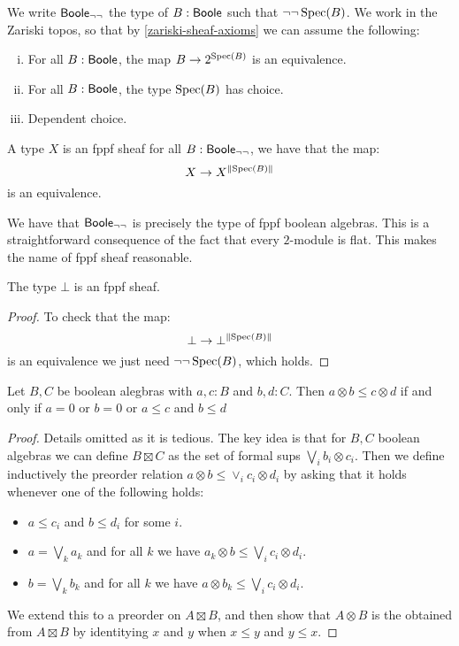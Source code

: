 We write $\mathsf{Boole}_{\neg\neg}$ the type of $B:\mathsf{Boole}$ such that $\neg\neg\operatorname{Spec}(B)$. We work in the Zariski topos, so that by \cref{zariski-sheaf-axioms} we can assume the following:

\begin{enumerate}[(i)]
\item For all $B:\mathsf{Boole}$, the map $B\to {2}^{\operatorname{Spec}(B)}$ is an equivalence.
\item For all $B:\mathsf{Boole}$, the type $\operatorname{Spec}(B)$ has choice.
\item Dependent choice.
\end{enumerate}

\begin{definition}
A type $X$ is an fppf sheaf for all $B:\mathsf{Boole}_{\neg\neg}$, we have that the map:
\[X\to X^{\lVert \operatorname{Spec}(B) \rVert}\]
is an equivalence.
\end{definition}

\begin{remark}
We have that $\mathsf{Boole}_{\neg\neg}$ is precisely the type of fppf boolean algebras. This is a straightforward consequence of the fact that every ${2}$-module is flat. This makes the name of fppf sheaf reasonable.
\end{remark}

\begin{lemma}\label{bot-sheaf}
The type $\bot$ is an fppf sheaf.
\end{lemma}

\begin{proof}
To check that the map:
\[\bot\to \bot^{\lVert \operatorname{Spec}(B) \rVert}\]
is an equivalence we just need $\neg\neg\operatorname{Spec}(B)$, which holds.
\end{proof}

\begin{lemma}\label{tensor-boolean-algebras}
Let $B,C$ be boolean alegbras with $a,c:B$ and $b,d:C$. Then $a\otimes b\leq c\otimes d$ if and only if $a=0$ or $b=0$ or $a\leq c$ and $b\leq d$
\end{lemma}

\begin{proof}
Details omitted as it is tedious. The key idea is that for $B,C$ boolean algebras we can define $B\boxtimes C$ as the set of formal sups $\bigvee_ib_i\otimes c_i$. Then we define inductively the preorder relation $a\otimes b\leq \lor_ic_i\otimes d_i$ by asking that it holds whenever one of the following holds:
\begin{itemize}
\item $a\leq c_i$ and $b\leq d_i$ for some $i$.
\item $a=\bigvee_k a_k$ and for all $k$ we have $a_k\otimes b\leq \bigvee_ic_i\otimes d_i$.
\item $b=\bigvee_k b_k$ and for all $k$ we have $a\otimes b_k\leq \bigvee_ic_i\otimes d_i$.
\end{itemize}
We extend this to a preorder on $A\boxtimes B$, and then show that $A\otimes B$ is the obtained from $A\boxtimes B$ by identitying $x$ and $y$ when $x\leq y$ and $y\leq x$.
\end{proof}

